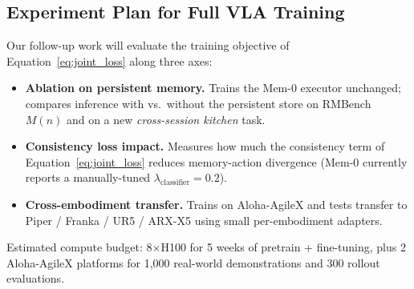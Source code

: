 \subsection{Experiment Plan for Full VLA Training}
\label{sec:exp:plan}

Our follow-up work will evaluate the training objective of
Equation~\ref{eq:joint_loss} along three axes:

\begin{itemize}
\item \textbf{Ablation on persistent memory.} Trains the Mem-0
      executor unchanged; compares inference with vs.\ without the
      persistent store on RMBench $M(n)$ and on a new
      \emph{cross-session kitchen} task.
\item \textbf{Consistency loss impact.} Measures how much the
      consistency term of Equation~\ref{eq:joint_loss} reduces
      memory-action divergence (Mem-0 currently reports a
      manually-tuned $\lambda_{\text{classifier}} = 0.2$).
\item \textbf{Cross-embodiment transfer.} Trains on Aloha-AgileX and
      tests transfer to Piper / Franka / UR5 / ARX-X5 using small
      per-embodiment adapters.
\end{itemize}

Estimated compute budget: 8$\times$H100 for 5 weeks of pretrain +
fine-tuning, plus 2 Aloha-AgileX platforms for 1,000 real-world
demonstrations and 300 rollout evaluations.
